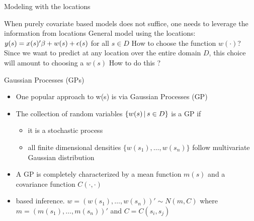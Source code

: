 
\begin{frame}{Modeling with the locations}
	\begin{itemize}
		\myitem When purely covariate based models does not suffice, one needs to leverage the information from locations
		\myitem General model using the locations: $y(s)=x(s)'\beta + w(s) + \epsilon(s)$ for all $s \in D$
		\myitem How to choose the function $w(\cdot)$?
		\myitem Since we want to predict at any location over the entire domain $D$, this choice will amount to choosing a  $w(s)$
		\myitem How to do this ? 
	\end{itemize}
\end{frame}

\begin{frame}{Gaussian Processes (GPs)}
	\begin{itemize}
		\item One popular approach to  w(s) is via Gaussian Processes (GP)
		\item The collection of random variables $\{w(s) \,|\, s\in D\}$ is a GP if 
		\begin{itemize}
			\item it is a  stochastic process
			\item all finite dimensional densities $\{w(s_1),\ldots,w(s_n)\}$ follow multivariate Gaussian distribution
		\end{itemize}
		\item A GP is completely characterized by a mean function $m(s)$ and a covariance function $C(\cdot,\cdot)$
		\item {}  based inference. $w=(w(s_1),\ldots,w(s_n))' \sim N(m,C)$ where $m=(m(s_1),\ldots,m(s_n))'$ and $C=C(s_i,s_j)$
	\end{itemize}
\end{frame}

